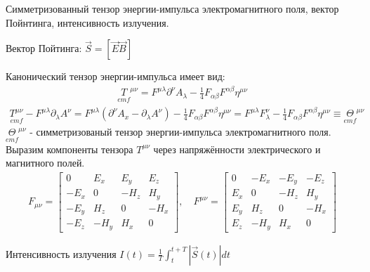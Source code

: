 \documentclass[__main__.tex]{subfiles}
\begin{document}
Симметризованный тензор энергии-импульса электромагнитного поля, вектор Пойнтинга, интенсивность излучения.\\

\begin{definition}
    Вектор Пойтинга: $\vec{S} = [\vec{E} \vec{B}]$
\end{definition}

Канонический тензор энергии-импульса имеет вид:
\begin{gather*}
    \underset{emf}{T}^{\mu\nu} = F^{\mu\lambda}\partial^\nu A_\lambda - \frac{1}{4}F_{\alpha\beta}F^{\alpha\beta}\eta^{\mu\nu}
\end{gather*}
\begin{gather*}
    \underset{emf}{T^{\mu\nu}} - F^{\mu\lambda}\partial_\lambda A^\nu = F^{\mu\lambda}(\partial^\nu A_x - \partial_\lambda A^\nu) - \frac{1}{4}F_{\alpha\beta}F^{\alpha\beta}\eta^{\mu\nu} = F^{\mu\lambda}F^\nu_\lambda - \frac{1}{4}F_{\alpha\beta}F^{\alpha\beta}\eta^{\mu\nu}\equiv \underset{emf}{\Theta}^{\mu\nu}
\end{gather*}
$\underset{emf}{\Theta}^{\mu\nu}$ - симметризованый тензор энергии-импульса электромагнитного поля.\\
Выразим компоненты тензора $T^{\mu\nu}$ через напряжённости электрического и магнитного полей.
\begin{gather}
    F_{\mu\nu}=
    \begin{bmatrix}
        0    & E_x  & E_y  & E_z  \\
        -E_x & 0    & -H_z & H_y  \\
        -E_y & H_z  & 0    & -H_x \\
        -E_z & -H_y & H_x  & 0
    \end{bmatrix},
    \quad F^{\mu\nu} =
    \begin{bmatrix}
        0   & -E_x & -E_y & -E_z \\
        E_x & 0    & -H_z & H_y  \\
        E_y & H_z  & 0    & -H_x \\
        E_z & -H_y & H_x  & 0
    \end{bmatrix}
\end{gather}

\begin{definition}
    Интенсивность излучения $I(t)=\frac{1}{T}\int^{t+T}_{t} |\vec{S}(t)| dt$
\end{definition}
\end{document}
